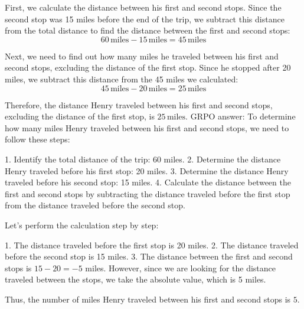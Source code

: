 \documentclass[11pt]{article}
\begin{document}
\begin{answerbox}
First, we calculate the distance between his first and second stops. Since the second stop was 15 miles before the end of the trip, we subtract this distance from the total distance to find the distance between the first and second stops:
\[60 \, \text{miles} - 15 \, \text{miles} = 45 \, \text{miles}\]

Next, we need to find out how many miles he traveled between his first and second stops, excluding the distance of the first stop. Since he stopped after 20 miles, we subtract this distance from the 45 miles we calculated:
\[45 \, \text{miles} - 20 \, \text{miles} = 25 \, \text{miles}\]

Therefore, the distance Henry traveled between his first and second stops, excluding the distance of the first stop, is $\boxed{25 \, \text{miles}}$.
GRPO answer:
To determine how many miles Henry traveled between his first and second stops, we need to follow these steps:

1. Identify the total distance of the trip: 60 miles.
2. Determine the distance Henry traveled before his first stop: 20 miles.
3. Determine the distance Henry traveled before his second stop: 15 miles.
4. Calculate the distance between the first and second stops by subtracting the distance traveled before the first stop from the distance traveled before the second stop.

Let's perform the calculation step by step:

1. The distance traveled before the first stop is 20 miles.
2. The distance traveled before the second stop is 15 miles.
3. The distance between the first and second stops is \(15 - 20 = -5\) miles. However, since we are looking for the distance traveled between the stops, we take the absolute value, which is 5 miles.

Thus, the number of miles Henry traveled between his first and second stops is \(\boxed{5}\).
\end{answerbox}
\end{document}

